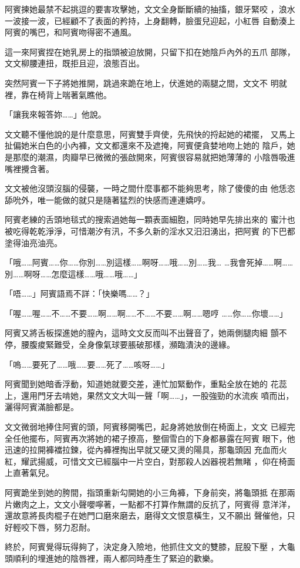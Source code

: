 阿賓揀她最禁不起挑逗的要害攻擊她，文文全身斷斷續的抽搐，銀牙緊咬
，浪水一波接一波，已經顧不了表面的矜持，上身翻轉，臉蛋兒迎起，小紅唇
自動湊上阿賓的嘴巴，和阿賓吻得密不通風。

這一來阿賓捏在她乳房上的指頭被迫放開，只留下扣在她陰戶內外的五爪
部隊，文文柳腰連扭，既拒且迎，浪態百出。

突然阿賓一下子將她推開，跳過來跪在地上，伏進她的兩腿之間，文文不
明就裡，靠在椅背上喘著氣瞧他。

「讓我來報答妳……」他說。

文文聽不懂他說的是什麼意思，阿賓雙手齊使，先飛快的捋起她的裙擺，
又馬上扯偏她米白色的小內褲，文文都還來不及遮掩，阿賓便貪婪地吻上她的
陰戶，她是那麼的潮濕，肉瓣早已微微的張啟開來，阿賓很容易就把她薄薄的
小陰唇吸進嘴裡攪含著。

文文被他沒頭沒腦的侵襲，一時之間什麼事都不能夠思考，除了傻傻的由
他恁恣舔吮外，唯一能做的就只是隨著猛烈的快感而連連嬌哼。

阿賓老練的舌頭地毯式的搜索過她每一顆表面細胞，同時她早先排出來的
蜜汁也被吃得乾乾淨淨，可惜潮汐有汛，不多久新的淫水又汨汨湧出，把阿賓
的下巴都塗得油亮油亮。

「哦……阿賓……你……你別……別這樣……啊呀……哦……別……我…
…我會死掉……啊……別……啊呀……怎麼這樣……哦……哦……」

「唔……」阿賓語焉不詳：「快樂嗎……？」

「喔……喔……不……不要……啊……啊……不……不要……啊……嗯哼
……你……你壞……」

阿賓又將舌板探進她的膣內，這時文文反而叫不出聲音了，她兩側腿肉細
顫不停，腰腹痠緊難受，全身像氣球要脹破那樣，瀕臨潰決的邊緣。

「嗚……要死了……哦……要……死了……咳呀……」

阿賓聞到她暗香浮動，知道她就要交差，連忙加緊動作，重點全放在她的
花蕊上，還用門牙去啃她，果然文文大叫一聲「啊……」，一股強勁的水流疾
噴而出，灑得阿賓滿臉都是。

文文微弱地捧住阿賓的頭，阿賓移開嘴巴，起身將她放倒在椅面上，文文
已經完全任他擺布，阿賓再次將她的裙子撩高，整個雪白的下身都暴露在阿賓
眼下，他迅速的拉開褲襠拉鍊，從內褲裡掏出早就又硬又燙的陽具，那龜頭因
充血而火紅，耀武揚威，可惜文文已經腦中一片空白，對那殺人凶器視若無睹
，仰在椅面上直著氣兒。

阿賓跪坐到她的胯間，指頭重新勾開她的小三角褲，下身前突，將龜頭抵
在那兩片嫩肉之上，文文小聲嚶嚀著，一點都不打算作無謂的反抗了，阿賓得
意洋洋，還故意將長肉棍子在她門口磨來磨去，磨得文文恨意橫生，又不願出
聲催他，只好輕咬下唇，努力忍耐。

終於，阿賓覺得玩得夠了，決定身入險地，他抓住文文的雙膝，屁股下壓
，大龜頭順利的埋進她的陰唇裡，兩人都同時產生了緊迫的歡樂。


